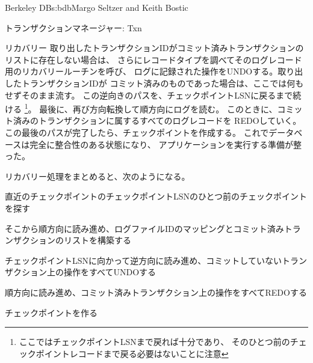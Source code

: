 \begin{aosachapter}{Berkeley DB}{s:bdb}{Margo Seltzer and Keith Bostic}
\begin{aosasect1}{トランザクションマネージャー: Txn}
\begin{aosasect2}{リカバリー}
取り出したトランザクションIDがコミット済みトランザクションのリストに存在しない場合は、
さらにレコードタイプを調べてそのログレコード用のリカバリールーチンを呼び、
ログに記録された操作をUNDOする。取り出したトランザクションIDが
コミット済みのものであった場合は、ここでは何もせずそのまま流す。
この逆向きのパスを、チェックポイントLSNに戻るまで続ける
\footnote{ここではチェックポイントLSNまで戻れば十分であり、
そのひとつ前のチェックポイントレコードまで戻る必要はないことに注意}。
最後に、再び方向転換して順方向にログを読む。
このときに、コミット済みのトランザクションに属するすべてのログレコードを
REDOしていく。
この最後のパスが完了したら、チェックポイントを作成する。
これでデータベースは完全に整合性のある状態になり、
アプリケーションを実行する準備が整った。

リカバリー処理をまとめると、次のようになる。

\vspace{-0.2cm}

\begin{aosaenumerate}

  \item 直近のチェックポイントのチェックポイントLSNのひとつ前のチェックポイントを探す

  \item そこから順方向に読み進め、ログファイルIDのマッピングとコミット済みトランザクションのリストを構築する

  \item チェックポイントLSNに向かって逆方向に読み進め、コミットしていないトランザクション上の操作をすべてUNDOする

  \item 順方向に読み進め、コミット済みトランザクション上の操作をすべてREDOする

  \item チェックポイントを作る

\end{aosaenumerate}


\end{aosasect2}
\end{aosasect1}
\end{aosachapter}
